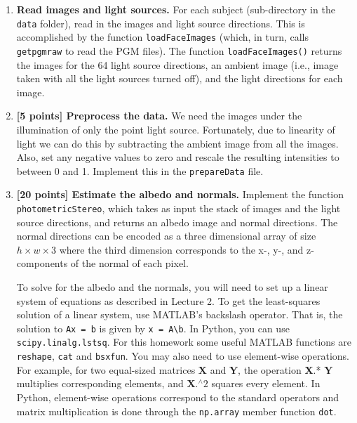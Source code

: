 \documentclass[10pt,letterpaper]{article}
\newcommand{\cmd}[1] {{\color{blue}\texttt{#1}}}
\begin{document}
\begin{enumerate}

\item \textbf{Read images and light sources.} For each subject (sub-directory in the \cmd{data} folder), read in the images and light source directions. This is accomplished by the function \cmd{loadFaceImages} (which, in turn, calls \cmd{getpgmraw} to read the PGM files). The function \cmd{loadFaceImages()} returns the images for the 64 light source directions, an ambient image (i.e., image taken with all the light sources turned off), and the light directions for each image.

\item \textbf{[5 points] Preprocess the data.} We need the images under the illumination of only the point light source. Fortunately, due to linearity of light we can do this by subtracting the ambient image from all the images. Also, set any negative values to zero and rescale the resulting intensities to between 0 and 1. Implement this in the \cmd{prepareData} file.


\item \textbf{[20 points] Estimate the albedo and  normals.} Implement the function  \cmd{photometricStereo}, which takes as input the stack of images and the light source directions, and returns an albedo image and normal directions. The normal directions can be encoded as a three dimensional array of size $h \times w \times 3$ where the third dimension corresponds to the x-, y-, and z-components of the normal of each pixel. 


To solve for the albedo and the normals, you will need to set up a linear system of equations as described in Lecture 2. To get the least-squares solution of a linear system, use MATLAB's backslash operator. That is, the solution to \cmd{Ax = b} is given by \cmd{x = A\textbackslash b}.
In Python, you can use \cmd{scipy.linalg.lstsq}. For this homework some useful MATLAB functions are \cmd{reshape}, \cmd{cat} and \cmd{bsxfun}.
You may also need to use element-wise operations. For example, for two equal-sized matrices $\mathbf{X}$ and $\mathbf{Y}$, the operation $\mathbf{X}$.* $\mathbf{Y}$ multiplies corresponding elements, and $\mathbf{X}.^\wedge 2$ squares every element.
In Python, element-wise operations correspond to the standard operators and matrix multiplication is done
through the \cmd{np.array} member function \cmd{dot}.


\end{enumerate}
\end{document}
